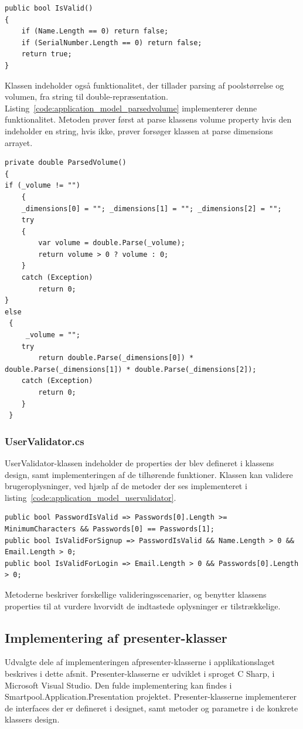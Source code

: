 \begin{lstlisting}[caption={IsValid()},label={code:application_model_pvisvalid}]
public bool IsValid()
{
	if (Name.Length == 0) return false;
	if (SerialNumber.Length == 0) return false;
	return true;
}
\end{lstlisting}

Klassen indeholder også funktionalitet, der tillader parsing af poolstørrelse og volumen, fra string til double-repræsentation. Listing~\ref{code:application_model_parsedvolume} implementerer denne funktionalitet. Metoden prøver først at parse klassens volume property hvis den indeholder en string, hvis ikke, prøver forsøger klassen at parse dimensions arrayet.

\begin{lstlisting}[caption={ParsedVolume()},label={code:application_model_parsedvolume}]
private double ParsedVolume()
{
if (_volume != "")
	{
	_dimensions[0] = ""; _dimensions[1] = ""; _dimensions[2] = "";
	try
	{
		var volume = double.Parse(_volume);
		return volume > 0 ? volume : 0;
	}
	catch (Exception)
		return 0;
}
else
 {
	 _volume = "";
	try
		return double.Parse(_dimensions[0]) * double.Parse(_dimensions[1]) * double.Parse(_dimensions[2]);
	catch (Exception)
		return 0;
	}
 }
\end{lstlisting}

\subsubsection{UserValidator.cs}
UserValidator-klassen indeholder de properties der blev defineret i klassens design, samt implementeringen af de tilhørende funktioner. Klassen kan validere brugeroplysninger, ved hjælp af de metoder der ses implementeret i listing~\ref{code:application_model_uservalidator}.

\begin{lstlisting}[caption={UserValidator valideringsmetoder},label={code:application_model_uservalidator}]
public bool PasswordIsValid => Passwords[0].Length >= MinimumCharacters && Passwords[0] == Passwords[1];
public bool IsValidForSignup => PasswordIsValid && Name.Length > 0 && Email.Length > 0;
public bool IsValidForLogin => Email.Length > 0 && Passwords[0].Length > 0;
\end{lstlisting}

Metoderne beskriver forskellige valideringsscenarier, og benytter klassens properties til at vurdere hvorvidt de indtastede oplysninger er tilstrækkelige.

\subsection{Implementering af presenter-klasser}
Udvalgte dele af implementeringen afpresenter-klasserne i applikationslaget beskrives i dette afsnit. Presenter-klasserne er udviklet i sproget C Sharp, i Microsoft Visual Studio. Den fulde implementering kan findes i Smartpool.Application.Presentation projektet. Presenter-klasserne implementerer de interfaces der er defineret i designet, samt metoder og parametre i de konkrete klassers design.

